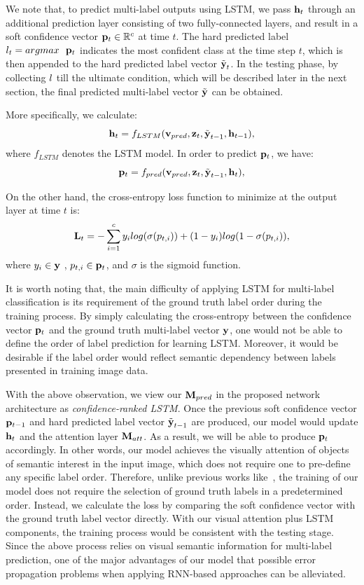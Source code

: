 \documentclass[letterpaper]{article} %
\begin{document}
We note that, to predict multi-label outputs using LSTM, we pass $\mathbf{h}_t$ through an additional prediction layer consisting of two fully-connected layers, and result in a soft confidence vector $\mathbf{p}_t \in \mathbb{R}^c$ at time $t$. The hard predicted label $l_t = argmax~~\mathbf{p}_t$ indicates the most confident class at the time step $t$, which is then appended to the hard predicted label vector $\tilde{\textbf{y}}_t$. In the testing phase, by collecting $l$ till the ultimate condition, which will be described later in the next section, the final predicted multi-label vector $\tilde{\textbf{y}}$ can be obtained.

More specifically, we calculate:
\begin{equation}
\label{eq:hidden}
\mathbf{h}_t = f_{LSTM}(\mathbf{v}_{pred}, \mathbf{z}_t, \tilde{\textbf{y}}_{t-1}, \mathbf{h}_{t-1}),
\end{equation}
where $f_{LSTM}$ denotes the LSTM model. In order to predict $\mathbf{p}_t$, we have:
\begin{equation}
\label{eq:prob}
\mathbf{p}_t = f_{pred}(\mathbf{v}_{pred}, \mathbf{z}_t, \tilde{\textbf{y}}_{t-1}, \mathbf{h}_t),
\end{equation}


On the other hand, the cross-entropy loss function to minimize at the output layer at time $t$ is:
\begin{equation}
\label{eq:loss}
\mathbf{L}_t = -\sum^{c}_{i=1} y_i log(\sigma(p_{t,i})) + (1 - y_i)log(1 - \sigma(p_{t,i})),
\end{equation}
where $y_i \in \textbf{y}$ , $p_{t,i} \in \mathbf{p}_t$, and $\sigma$ is the sigmoid function.

It is worth noting that, the main difficulty of applying LSTM for multi-label classification is its requirement of the ground truth label order during the training process. By simply calculating the cross-entropy between the confidence vector $\mathbf{p}_t$ and the ground truth multi-label vector $\textbf{y}$, one would not be able to define the order of label prediction for learning LSTM. Moreover, it would be desirable if the label order would reflect semantic dependency between labels presented in training image data.

With the above observation, we view our $\mathbf{M}_{pred}$ in the proposed network architecture as \emph{confidence-ranked LSTM}. Once the previous soft confidence vector $\mathbf{p}_{t-1}$ and hard predicted label vector $\tilde{\textbf{y}}_{t-1}$ are produced, our model would update $\mathbf{h}_t$ and the attention layer $\mathbf{M}_{att}$. As a result, we will be able to produce $\mathbf{p}_{t}$ accordingly. In other words, our model achieves the visually attention of objects of semantic interest in the input image, which does not require one to pre-define any specific label order. Therefore, unlike previous works like~\cite{wang2016cnn}, the training of our model does not require the selection of ground truth labels in a predetermined order. Instead, we calculate the loss by comparing the soft confidence vector with the ground truth label vector directly. With our visual attention plus LSTM components, the training process would be consistent with the testing stage. Since the above process relies on visual semantic information for multi-label prediction, one of the major advantages of our model that possible error propagation problems when applying RNN-based approaches can be alleviated.
\end{document}

